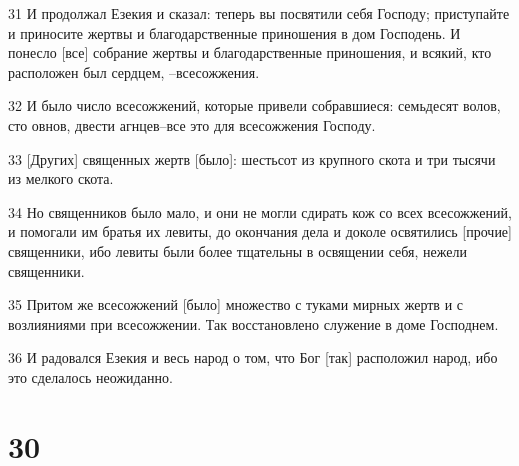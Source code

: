 \par 31 И продолжал Езекия и сказал: теперь вы посвятили себя Господу; приступайте и приносите жертвы и благодарственные приношения в дом Господень. И понесло [все] собрание жертвы и благодарственные приношения, и всякий, кто расположен был сердцем, --всесожжения.
\par 32 И было число всесожжений, которые привели собравшиеся: семьдесят волов, сто овнов, двести агнцев--все это для всесожжения Господу.
\par 33 [Других] священных жертв [было]: шестьсот из крупного скота и три тысячи из мелкого скота.
\par 34 Но священников было мало, и они не могли сдирать кож со всех всесожжений, и помогали им братья их левиты, до окончания дела и доколе освятились [прочие] священники, ибо левиты были более тщательны в освящении себя, нежели священники.
\par 35 Притом же всесожжений [было] множество с туками мирных жертв и с возлияниями при всесожжении. Так восстановлено служение в доме Господнем.
\par 36 И радовался Езекия и весь народ о том, что Бог [так] расположил народ, ибо это сделалось неожиданно.

\chapter{30}

